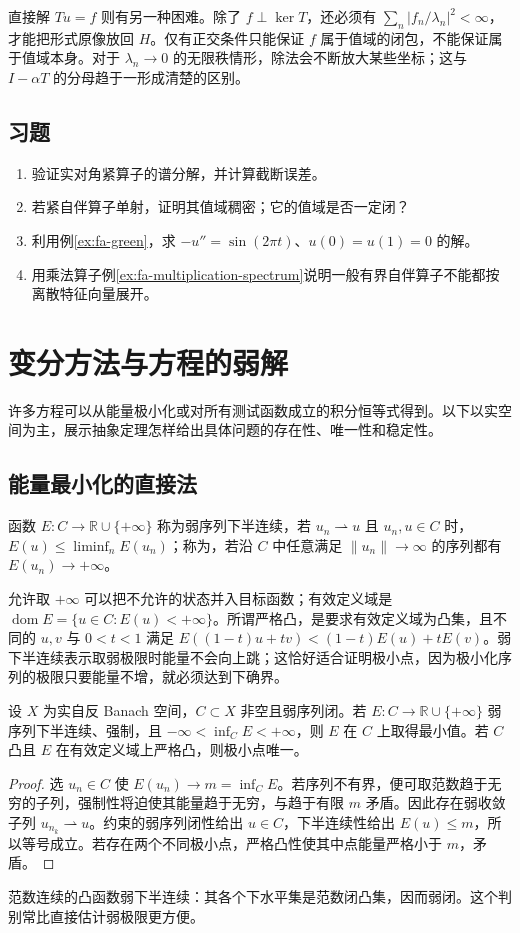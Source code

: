 \documentclass[UTF8,12pt,a4paper,fontset=fandol]{ctexbook}
\begin{document}
直接解 $Tu=f$ 则有另一种困难。除了 $f\perp\ker T$，还必须有 $\sum_n|f_n/\lambda_n|^2<\infty$，才能把形式原像放回 $H$。仅有正交条件只能保证 $f$ 属于值域的闭包，不能保证属于值域本身。对于 $\lambda_n\to0$ 的无限秩情形，除法会不断放大某些坐标；这与 $I-\alpha T$ 的分母趋于一形成清楚的区别。

\section{习题}
\begin{enumerate}
 \item 验证实对角紧算子的谱分解，并计算截断误差。
 \item 若紧自伴算子单射，证明其值域稠密；它的值域是否一定闭？
 \item 利用例\ref{ex:fa-green}，求 $-u''=\sin(2\pi t)$、$u(0)=u(1)=0$ 的解。
 \item 用乘法算子例\ref{ex:fa-multiplication-spectrum}说明一般有界自伴算子不能都按离散特征向量展开。
\end{enumerate}

\chapter{变分方法与方程的弱解}
\label{chap:fa-variational}

许多方程可以从能量极小化或对所有测试函数成立的积分恒等式得到。以下以实空间为主，展示抽象定理怎样给出具体问题的存在性、唯一性和稳定性。

\section{能量最小化的直接法}
函数 $E:C\to\mathbb R\cup\{+\infty\}$ 称为弱序列下半连续，若 $u_n\rightharpoonup u$ 且 $u_n,u\in C$ 时，$E(u)\leq\liminf_nE(u_n)$；称为，若沿 $C$ 中任意满足 $\|u_n\|\to\infty$ 的序列都有 $E(u_n)\to+\infty$。

允许取 $+\infty$ 可以把不允许的状态并入目标函数；有效定义域是 $\operatorname{dom}E=\{u\in C:E(u)<+\infty\}$。所谓严格凸，是要求有效定义域为凸集，且不同的 $u,v$ 与 $0<t<1$ 满足 $E((1-t)u+tv)<(1-t)E(u)+tE(v)$。弱下半连续表示取弱极限时能量不会向上跳；这恰好适合证明极小点，因为极小化序列的极限只要能量不增，就必须达到下确界。

\begin{theorem}[直接法]\label{thm:fa-direct-method}
设 $X$ 为实自反 Banach 空间，$C\subset X$ 非空且弱序列闭。若 $E:C\to\mathbb R\cup\{+\infty\}$ 弱序列下半连续、强制，且 $-\infty<\inf_CE<+\infty$，则 $E$ 在 $C$ 上取得最小值。若 $C$ 凸且 $E$ 在有效定义域上严格凸，则极小点唯一。
\end{theorem}
\begin{proof}
选 $u_n\in C$ 使 $E(u_n)\to m=\inf_CE$。若序列不有界，便可取范数趋于无穷的子列，强制性将迫使其能量趋于无穷，与趋于有限 $m$ 矛盾。因此存在弱收敛子列 $u_{n_k}\rightharpoonup u$。约束的弱序列闭性给出 $u\in C$，下半连续性给出 $E(u)\leq m$，所以等号成立。若存在两个不同极小点，严格凸性使其中点能量严格小于 $m$，矛盾。
\end{proof}
范数连续的凸函数弱下半连续：其各个下水平集是范数闭凸集，因而弱闭。这个判别常比直接估计弱极限更方便。
\end{document}
